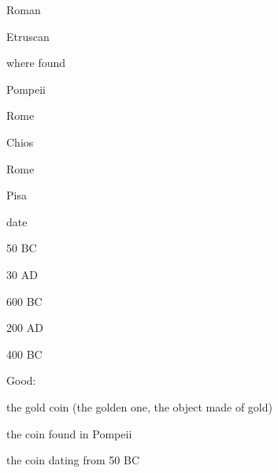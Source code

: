 \documentclass[compress,color=usenames]{beamer}
\begin{document}
\begin{frame}
Roman



Etruscan






where found



Pompeii



Rome



Chios



Rome



Pisa






date



50 BC



30 AD



600 BC



200 AD



400 BC






Good:



the gold coin (the golden one, the object made of gold)



the coin found in Pompeii



the coin dating from 50 BC










\end{frame}
\end{document}

